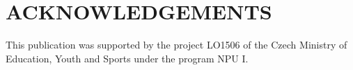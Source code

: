 \documentclass[a4paper,twoside]{article}
\begin{document}
\section*{\uppercase{Acknowledgements}}

\noindent This publication was supported by the project LO1506 of the Czech Ministry of Education, Youth and Sports under the program NPU I.


{\small
}

\vfill
\end{document}

